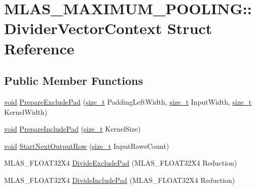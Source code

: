\hypertarget{structMLAS__MAXIMUM__POOLING_1_1DividerVectorContext}{}\section{M\+L\+A\+S\+\_\+\+M\+A\+X\+I\+M\+U\+M\+\_\+\+P\+O\+O\+L\+I\+NG\+:\+:Divider\+Vector\+Context Struct Reference}
\label{structMLAS__MAXIMUM__POOLING_1_1DividerVectorContext}
\subsection*{Public Member Functions}
\begin{DoxyCompactItemize}
\item 
\mbox{\hyperlink{mlasi_8h_a88f941d423cb2a819b70a1358982b1a6}{void}} \mbox{\hyperlink{structMLAS__MAXIMUM__POOLING_1_1DividerVectorContext_a03a2850faa21d463b2973add6ec74355}{Prepare\+Exclude\+Pad}} (\mbox{\hyperlink{mlasi_8h_a503efbc1c6e50825320ad909366b78ab}{size\+\_\+t}} Padding\+Left\+Width, \mbox{\hyperlink{mlasi_8h_a503efbc1c6e50825320ad909366b78ab}{size\+\_\+t}} Input\+Width, \mbox{\hyperlink{mlasi_8h_a503efbc1c6e50825320ad909366b78ab}{size\+\_\+t}} Kernel\+Width)
\item 
\mbox{\hyperlink{mlasi_8h_a88f941d423cb2a819b70a1358982b1a6}{void}} \mbox{\hyperlink{structMLAS__MAXIMUM__POOLING_1_1DividerVectorContext_aeada23d52fc1d1c4ff2eab8c8033d54d}{Prepare\+Include\+Pad}} (\mbox{\hyperlink{mlasi_8h_a503efbc1c6e50825320ad909366b78ab}{size\+\_\+t}} Kernel\+Size)
\item 
\mbox{\hyperlink{mlasi_8h_a88f941d423cb2a819b70a1358982b1a6}{void}} \mbox{\hyperlink{structMLAS__MAXIMUM__POOLING_1_1DividerVectorContext_ac9816bc12207611e2558121602027305}{Start\+Next\+Output\+Row}} (\mbox{\hyperlink{mlasi_8h_a503efbc1c6e50825320ad909366b78ab}{size\+\_\+t}} Input\+Rows\+Count)
\item 
M\+L\+A\+S\+\_\+\+F\+L\+O\+A\+T32\+X4 \mbox{\hyperlink{structMLAS__MAXIMUM__POOLING_1_1DividerVectorContext_ad292fc8ec3441ce8aecaaea4756e9130}{Divide\+Exclude\+Pad}} (M\+L\+A\+S\+\_\+\+F\+L\+O\+A\+T32\+X4 Reduction)
\item 
M\+L\+A\+S\+\_\+\+F\+L\+O\+A\+T32\+X4 \mbox{\hyperlink{structMLAS__MAXIMUM__POOLING_1_1DividerVectorContext_a617c049d2e12f2a1651365f1331226f4}{Divide\+Include\+Pad}} (M\+L\+A\+S\+\_\+\+F\+L\+O\+A\+T32\+X4 Reduction)
\end{DoxyCompactItemize}


